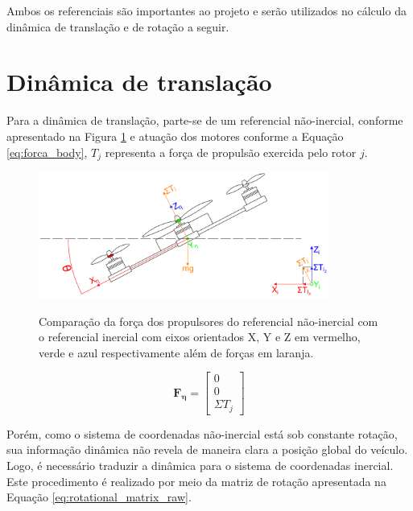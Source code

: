 \documentclass[main.tex]{subfiles}
\begin{document}
Ambos os referenciais são importantes ao projeto e serão utilizados no cálculo da dinâmica de translação e de rotação a seguir.

\section{Dinâmica de translação}

Para a dinâmica de translação, parte-se de um referencial não-inercial, conforme apresentado na Figura \ref{fig:ref_frame} e atuação dos motores conforme a Equação \ref{eq:forca_body}, $T_j$ representa a força de propulsão exercida pelo rotor $j$.

\begin{figure}[!h]
    \centering
    \caption{Comparação da força dos propulsores do referencial não-inercial com o referencial inercial com eixos orientados X, Y e Z em vermelho, verde e azul respectivamente além de forças em laranja.}
    \includegraphics[width=0.85\textwidth]{capitulos/modelagem/imgs/ref_frame.png}
    \label{fig:ref_frame}
\end{figure}

\begin{equation}\label{eq:forca_body}
    \boldsymbol{F_\eta} = \begin{bmatrix}
        0\\
        0\\
        \Sigma T_j
    \end{bmatrix}
\end{equation}

Porém, como o sistema de coordenadas não-inercial está sob constante rotação, sua informação dinâmica não revela de maneira clara a posição global do veículo. Logo, é necessário traduzir a dinâmica para o sistema de coordenadas inercial. Este procedimento é realizado por meio da matriz de rotação \cite{robotica} apresentada na Equação \ref{eq:rotational_matrix_raw}.
\end{document}
